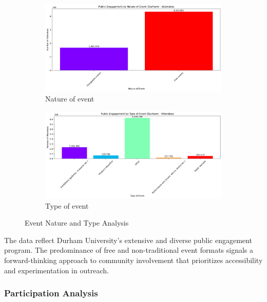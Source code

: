 \documentclass[journal,onecolumn, 10pt,draftclsnofoot]{IEEEtran}
\begin{document}
\begin{figure}[h]
\centering
\begin{subfigure}[b]{0.48\textwidth}
    \centering
    \includegraphics[width=\textwidth]{Fig/figure30.nature_of_event.png}
    \caption{Nature of event}
    \label{fig:nature-of-event}
\end{subfigure}
\hfill
\begin{subfigure}[b]{0.48\textwidth}
    \centering
    \includegraphics[width=\textwidth]{Fig/figure31.type_of_event.png}
    \caption{Type of event}
    \label{fig:type-of-event}
\end{subfigure}
\vspace{0.6cm}
\caption{Event Nature and Type Analysis}
\label{fig:event-analysis}
\end{figure}

The data reflect Durham University's extensive and diverse public engagement program. The predominance of free and non-traditional event formats signals a forward-thinking approach to community involvement that prioritizes accessibility and experimentation in outreach.

\subsubsection{Participation Analysis}
\end{document}
